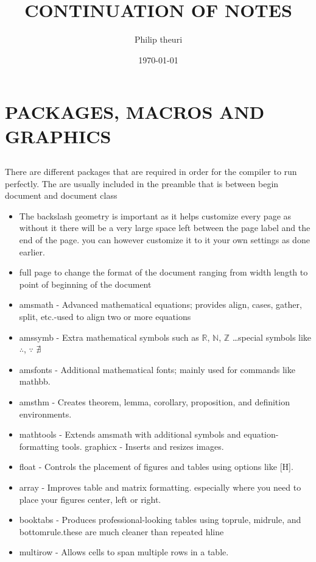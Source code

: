 \documentclass[a4paper,12pt]{article}
\title{CONTINUATION OF NOTES}
\author{Philip theuri}
\date{\today}
\begin{document}
	\tableofcontents
\maketitle


{
\section{PACKAGES, MACROS AND GRAPHICS}
\subsection{}
There are different packages that are required in order for the compiler to run perfectly.
The are usually included in the preamble that is  between begin document and document class
\begin{itemize}
	\item The backslash geometry is important as it helps customize every page as without it there will be a very large space left between the page label and the end of the page. you can however customize it to it your own settings as done earlier.\\
\item full page to change the format of the document ranging from width length to point of beginning of the document
\item amsmath  - Advanced mathematical equations; provides align, cases, gather, split, etc.-used to align two or more equations\\
\item amssymb     - Extra mathematical symbols such as $\mathbb{R}$, $\mathbb{N}$, $\mathbb{Z}$ \ldots special symbols like $\therefore$, $\because$ $\nexists$\\
\item amsfonts     - Additional mathematical fonts; mainly used for commands like mathbb.\\
\item amsthm       - Creates theorem, lemma, corollary, proposition, and definition environments.\\

\item mathtools    - Extends amsmath with additional symbols and equation-formatting tools.
graphicx     - Inserts and resizes images.\\
\item float        - Controls the placement of figures and tables using options like [H].\\
\item array        - Improves table and matrix formatting. especially where you need to place your figures center, left or right.
\item booktabs     - Produces professional-looking tables using toprule, midrule, and bottomrule.these are much cleaner than repeated hline\\
\item multirow     - Allows cells to span multiple rows in a table.\\


\end{itemize}}
\end{document}
